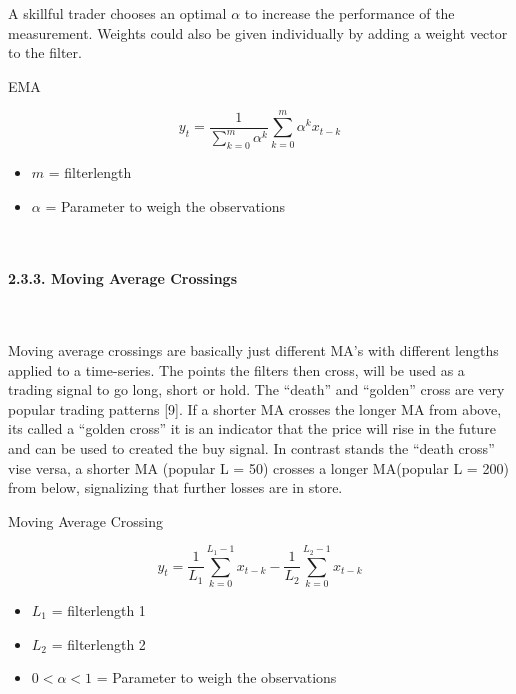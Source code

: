 \documentclass[
]{article}
\providecommand{\tightlist}{%
  \setlength{\itemsep}{0pt}\setlength{\parskip}{0pt}}
\begin{document}
A skillful trader chooses an optimal \(\alpha\) to increase the
performance of the measurement. Weights could also be given individually
by adding a weight vector to the filter.

EMA

\begin{equation}
  \label{eq:ema}
  y_{t}=\frac{1}{\sum_{k=0}^{m}\alpha^{k}}\sum_{k=0}^{m}\alpha^{k}x_{t-k}
\end{equation}

\begin{itemize}
\tightlist
\item
  \({m}\) = filterlength
\item
  \({\alpha}\) = Parameter to weigh the observations
\end{itemize}

~

\hypertarget{moving-average-crossings}{%
\paragraph{2.3.3. Moving Average
Crossings}\label{moving-average-crossings}}

~

Moving average crossings are basically just different MA's with
different lengths applied to a time-series. The points the filters then
cross, will be used as a trading signal to go long, short or hold. The
``death'' and ``golden'' cross are very popular trading patterns
{[}9{]}. If a shorter MA crosses the longer MA from above, its called a
``golden cross'' it is an indicator that the price will rise in the
future and can be used to created the buy signal. In contrast stands the
``death cross'' vise versa, a shorter MA (popular L = 50) crosses a
longer MA(popular L = 200) from below, signalizing that further losses
are in store.

Moving Average Crossing

\begin{equation}
  \label{eq:mac}
  y_{t}=\frac{1}{L_1}\sum_{k=0}^{L_1-1}x_{t-k} - \frac{1}{L_2}\sum_{k=0}^{L_2-1}x_{t-k}
\end{equation}

\begin{itemize}
\tightlist
\item
  \({L_1}\) = filterlength 1
\item
  \({L_2}\) = filterlength 2
\item
  \({0 < \alpha < 1}\) = Parameter to weigh the observations
\end{itemize}
\end{document}
